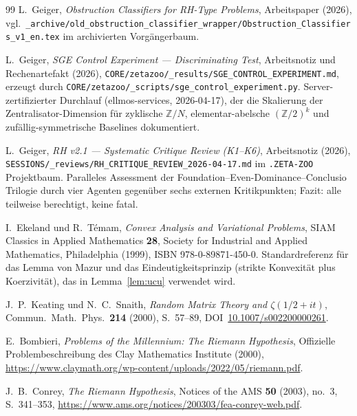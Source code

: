 \documentclass[11pt]{article}
\theoremstyle{definition}
\theoremstyle{remark}
\begin{document}
\begin{thebibliography}{99}
L.~Geiger, \emph{Obstruction Classifiers for RH-Type Problems},
Arbeitspaper (2026), vgl.\ \texttt{\_archive/old\_obstruction\_classifier\_wrapper/Obstruction\_Classifiers\_v1\_en.tex}
im archivierten Vorgängerbaum.

L.~Geiger, \emph{SGE Control Experiment --- Discriminating Test},
Arbeitsnotiz und Rechenartefakt (2026),
\texttt{CORE/zetazoo/\_results/SGE\_CONTROL\_EXPERIMENT.md},
erzeugt durch
\texttt{CORE/zetazoo/\_scripts/sge\_control\_experiment.py}.
Server-zertifizierter Durchlauf (ellmos-services, 2026-04-17), der die
Skalierung der Zentralisator-Dimension für zyklische $\mathbb{Z}/N$,
elementar-abelsche $(\mathbb{Z}/2)^k$ und zufällig-symmetrische
Baselines dokumentiert.

L.~Geiger, \emph{RH v2.1 --- Systematic Critique Review (K1--K6)},
Arbeitsnotiz (2026), \texttt{SESSIONS/\_reviews/RH\_CRITIQUE\_REVIEW\_2026-04-17.md}
im \texttt{.ZETA-ZOO} Projektbaum.
Paralleles Assessment der Foundation--Even-Dominance--Conclusio
Trilogie durch vier Agenten gegenüber sechs externen Kritikpunkten; Fazit: alle teilweise berechtigt,
keine fatal.

I.~Ekeland und R.~T\'emam, \emph{Convex Analysis and Variational
Problems}, SIAM Classics in Applied Mathematics \textbf{28}, Society
for Industrial and Applied Mathematics, Philadelphia (1999),
ISBN 978-0-89871-450-0. Standardreferenz für das Lemma von Mazur und
das Eindeutigkeitsprinzip (strikte Konvexität plus Koerzivität), das in
Lemma~\ref{lem:ucu} verwendet wird.


J.~P.~Keating und N.~C.~Snaith, \emph{Random Matrix Theory and
$\zeta(1/2 + it)$}, Commun.\ Math.\ Phys.\ \textbf{214} (2000),
S.~57--89, DOI~\href{https://doi.org/10.1007/s002200000261}{10.1007/s002200000261}.

E.~Bombieri, \emph{Problems of the Millennium: The Riemann
Hypothesis}, Offizielle Problembeschreibung des Clay Mathematics Institute (2000),
\url{https://www.claymath.org/wp-content/uploads/2022/05/riemann.pdf}.

J.~B.~Conrey, \emph{The Riemann Hypothesis}, Notices of the AMS
\textbf{50} (2003), no.~3, S.~341--353,
\url{https://www.ams.org/notices/200303/fea-conrey-web.pdf}.


\end{thebibliography}
\end{document}
